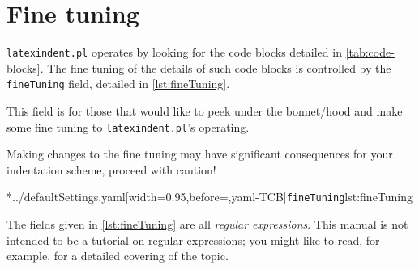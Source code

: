 \section{Fine tuning}\label{sec:finetuning}
\texttt{latexindent.pl} operates by looking for the code blocks detailed in \vref{tab:code-blocks}.
 The fine tuning of the details of such code blocks
is controlled by the \texttt{fineTuning} field, detailed in \cref{lst:fineTuning}.

This field is for those that would like to peek under the bonnet/hood and make some
fine tuning to \texttt{latexindent.pl}'s operating.

\begin{warning}
	Making changes to the fine tuning may have significant consequences for your indentation scheme,
	proceed with caution!
\end{warning}

\begin{widepage}
\cmhlistingsfromfile*[style=fineTuning]*{../defaultSettings.yaml}[width=0.95\linewidth,before=\centering,yaml-TCB]{\texttt{fineTuning}}{lst:fineTuning}
\end{widepage}

The fields given in \cref{lst:fineTuning} are all \emph{regular expressions}. This manual is not intended to be
a tutorial on regular expressions; you might like to read, for example, \cite{masteringregexp} for a detailed
covering of the topic.

